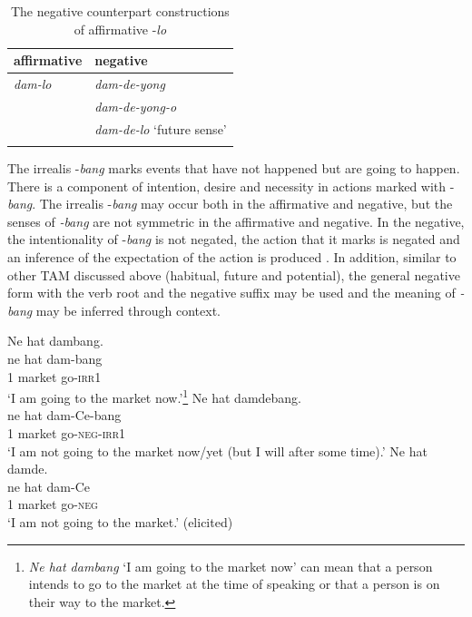 \documentclass[output=paper,colorlinks,citecolor=brown]{langscibook}
\begin{document}
\begin{table}
\centering
\begin{tabularx}{.5\textwidth}{lX}
\lsptoprule
affirmative & negative \\
\midrule 
\itshape dam-lo & \itshape dam-de-yong \\
& \itshape dam-de-yong-o \\
& \textit{dam-de-lo} ‘future sense’\\
\lspbottomrule
\end{tabularx}
    \caption{The negative counterpart constructions of affirmative -\textit{lo}}
    \label{tab:amr:2}
\end{table}

The irrealis -\textit{bang} marks events that have not happened but are going to happen. There is a component of intention, desire and necessity in actions marked with -\textit{bang}. The irrealis -\textit{bang} may occur both in the affirmative and negative, but the senses of \textit{{}-bang} are not symmetric in the affirmative and negative. In the negative, the intentionality of -\textit{bang} is not negated, the action that it marks is negated and an inference of the expectation of the action is produced . In addition, similar to other TAM discussed above (habitual, future and potential), the general negative form with the verb root and the negative suffix may be used and the meaning of \textit{{}-bang} may be inferred through context.

\ea\label{ex:amr:9}
    \ea\label{ex:amr:9a} Ne hat dambang.  \\ 
        \gll ne hat dam-bang \\
              1 market go-\textsc{irr1} \\
        \glt ‘I am going to the market now.’\footnote{\textit{Ne hat dambang} ‘I am going to the market now’ can mean that a person intends to go to the market at the time of speaking or that a person is on their way to the market.} 
    \ex\label{ex:amr:9b}  Ne hat damdebang. \\
        \gll ne hat dam-Ce-bang\\
              1 market go-\textsc{neg}{}-\textsc{irr1}\\
        \glt  ‘I am not going to the market now/yet (but I will after some time).’
    \ex\label{ex:amr:9c} Ne hat damde. \\
        \gll ne hat dam-Ce\\
              1 market go-\textsc{neg}\\
        \glt ‘I am not going to the market.’ (elicited)
    \z
\z 
\end{document}
